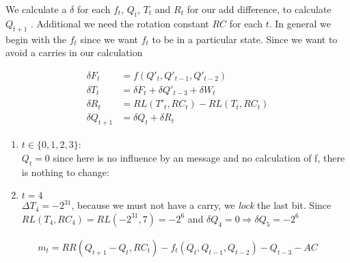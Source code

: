 We calculate a $\delta$ for each $f_t$, $Q_t$, $T_t$ and $R_t$ for our add difference, to calculate $Q_{t+1}$ .
Additional we need the rotation constant $RC$ for each $t$. 
In general we begin with the $f_t$ since we want $f_t$ to be in a particular state.
Since we want to avoid a carries in our calculation 


\begin{align*}
    \delta F_t &= f \left( Q'_t,Q'_{t-1},Q'_{t-2} \right) \\
    \delta T_t &= \delta F_t + \delta  Q'_{t-3} + \delta W_t \\
    \delta R_t &=  RL \left(T'_t,RC_t \right) - RL \left(T_t,RC_t \right)\\
    \delta Q_{t+1} &= \delta Q_t + \delta R_t
\end{align*}


\begin{enumerate}
    \item $t \in \{0,1,2,3\}$:\\
     $Q_t = 0 $ since here is no influence by an message and no calculation of f, there is nothing to change:
    \item $t = 4$\\
    $\Delta T_4 = -2^{31}$, because we must not have a carry, we \textit{lock} the last bit.
    Since  $RL(T_4, RC_4) = RL(-2^{31}, 7) = -2^6 $ and $\delta Q_4 = 0 \Rightarrow  \delta Q_5 = -2^6$  
\end{enumerate}

\newpage


\begin{align*}
    m_t = RR \left( Q_{t+1} - Q_t , RC_t\right) - f_t \left( Q_t, Q_{t-1}, Q_{t-2} \right) - Q_{t-3} - AC
\end{align*}

